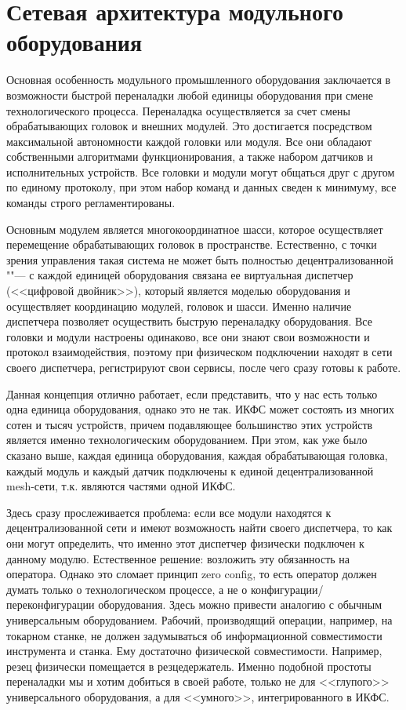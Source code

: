 \section{Сетевая архитектура модульного оборудования}\label{sec:ch3/sec2}

Основная особенность модульного промышленного оборудования заключается в возможности быстрой переналадки любой единицы оборудования при смене технологического процесса. Переналадка осуществляется за счет смены обрабатывающих головок и внешних модулей.  Это достигается посредством максимальной автономности каждой головки или модуля. Все они обладают собственными алгоритмами функционирования, а также набором датчиков и исполнительных устройств. Все головки и модули могут общаться друг с другом по единому протоколу, при этом набор команд и данных сведен к минимуму, все команды строго регламентированы.

Основным модулем является многокоординатное шасси, которое осуществляет перемещение обрабатывающих головок в пространстве. Естественно, с точки зрения управления такая система не может быть полностью децентрализованной ""--- с каждой единицей оборудования связана ее виртуальная диспетчер (<<цифровой двойник>>), который является моделью оборудования и осуществляет координацию модулей, головок и шасси. Именно наличие диспетчера позволяет осуществить быструю переналадку оборудования. Все головки и модули настроены одинаково, все они знают свои возможности и протокол взаимодействия, поэтому при физическом подключении находят в сети своего диспетчера, регистрируют свои сервисы, после чего сразу готовы к работе.

Данная концепция отлично работает, если представить, что у нас есть только одна единица оборудования, однако это не так. ИКФС может состоять из многих сотен и тысяч устройств, причем подавляющее большинство этих устройств является именно технологическим оборудованием. При этом, как уже было сказано выше, каждая единица оборудования, каждая обрабатывающая головка, каждый модуль и каждый датчик подключены к единой децентрализованной mesh-сети, т.\:к. являются частями одной ИКФС.

Здесь сразу прослеживается проблема: если все модули находятся к децентрализованной сети и имеют возможность найти своего диспетчера, то как они могут определить, что именно этот диспетчер физически подключен к данному модулю. Естественное решение: возложить эту обязанность на оператора. Однако это сломает принцип zero config, то есть оператор должен думать только о технологическом процессе, а не о конфигурации/переконфигурации оборудования. Здесь можно привести аналогию с обычным универсальным оборудованием. Рабочий, производящий операции, например, на токарном станке, не должен задумываться об информационной совместимости инструмента и станка. Ему достаточно физической совместимости. Например, резец физически помещается в резцедержатель. Именно подобной простоты переналадки мы и хотим добиться в своей работе, только не для <<глупого>> универсального оборудования, а для <<умного>>, интегрированного в ИКФС.

